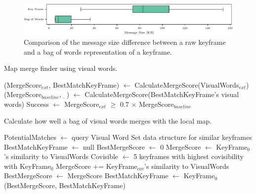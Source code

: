 \begin{figure}[h]
    \centering
    \includegraphics[width=\linewidth]{figures/apr20_mh_trajectory_g_kf_vs_bow_msg_size.pdf}
    \caption{Comparison of the message size difference between a raw keyframe and a bag of words representation of a keyframe.}
    \label{fig:kf-vs-bow-msg-size}
\end{figure}
\hspace{0.15in}
\begin{algorithm}[H]
    \caption{Map merge finder using visual words.}
    \label{alg:map-merge-finder}
    \begin{algorithmic}[1]
        \State (MergeScore$_{ext}$, BestMatchKeyFrame) $\gets$ CalculateMergeScore(VisualWords$_{ext}$)
        \State (MergeScore$_{baseline}$, $\underbar{\ \ }$) $\gets$ CalculateMergeScore(BestMatchKeyFrame's visual words)
        \State Success $\gets$ MergeScore$_{ext}$ $\geq$ 0.7 $\times$ MergeScore$_{baseline}$
    \end{algorithmic}
\end{algorithm}
\vspace{-0.25in}
\begin{algorithm}[H]
    \caption{Calculate how well a bag of visual words merges with the local map.}
    \label{alg:calculate-merge-score}
    \begin{algorithmic}[1]
        \State PotentialMatches $\gets$ query Visual Word Set data structure for similar keyframes
        \State BestMatchKeyFrame $\gets$ null
        \State BestMergeScore $\gets$ 0
        \State MergeScore $\gets$ KeyFrame$_0$'s similarity to VisualWords
        \State Covisible $\gets$ 5 keyframes with highest covisibility with KeyFrame$_0$
         
        \State MergeScore += KeyFrame$_{cov}$'s similarity to VisualWords
        \EndFor
        \State BestMergeScore $\gets$ MergeScore
        \State BestMatchKeyFrame $\gets$ KeyFrame$_0$
        \EndIf
        \EndFor
        \Return (BestMergeScore, BestMatchKeyFrame)
        \EndProcedure
    \end{algorithmic}
\end{algorithm}

